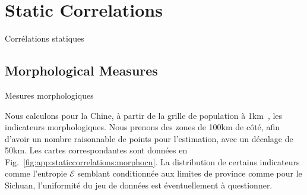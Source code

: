




\newpage

\section{Static Correlations}{Corrélations statiques}

\label{app:sec:staticcorrelations}



\subsection{Morphological Measures}{Mesures morphologiques}


%

Nous calculons pour la Chine, à partir de la grille de population à 1km~\cite{fu1km}, les indicateurs morphologiques. Nous prenons des zones de 100km de côté, afin d'avoir un nombre raisonnable de points pour l'estimation, avec un décalage de 50km. Les cartes correspondantes sont données en Fig.~\ref{fig:app:staticcorrelations:morphocn}. La distribution de certains indicateurs comme l'entropie $\mathcal{E}$ semblant conditionnée aux limites de province comme pour le Sichuan, l'uniformité du jeu de données est éventuellement à questionner.



